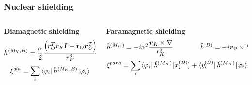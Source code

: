 \begin{frame}
\frametitle{Nuclear shielding}
\begin{columns}

\begin{column}[b]{0.4\textwidth}
\centering
\textbf{Diamagnetic shielding}
\begin{equation}
    \nonumber
    \hat{h}^{(M_K,B)} =
    \frac{\alpha}{2}\frac{\Big(r_O^Tr_K\boldsymbol{I} - 
    \boldsymbol{r}_O\boldsymbol{r}_O^T\Big)}{r_K^3}
\end{equation}
\vspace{2mm}
\begin{equation}
    \nonumber
    \xi^{dia} = \sum_i \bra{\varphi_i} \hat{h}^{(M_K,B)} \ket{\varphi_i}
\end{equation}
\end{column}

\begin{column}[b]{0.6\textwidth}
\centering
\textbf{Paramagnetic shielding}
\begin{equation}
    \nonumber
    \hat{h}^{(M_K)} 
    = -i \alpha^2 \frac{\boldsymbol{r}_K\times\nabla}{r_K^3} \qquad \qquad
    \hat{h}^{(B)} = -i \boldsymbol{r}_O\times\nabla
\end{equation}
\vspace{2mm}
\begin{equation}
    \nonumber
    \xi^{para} = \sum_i 
    \bra{\varphi_i}\hat{h}^{(M_K)} \ket{x_i^{(B)}} + 
    \bra{y_i^{(B)}}\hat{h}^{(M_K)}\ket{\varphi_i}
\end{equation}
\end{column}

\end{columns}
\vspace{5mm}


\end{frame}
